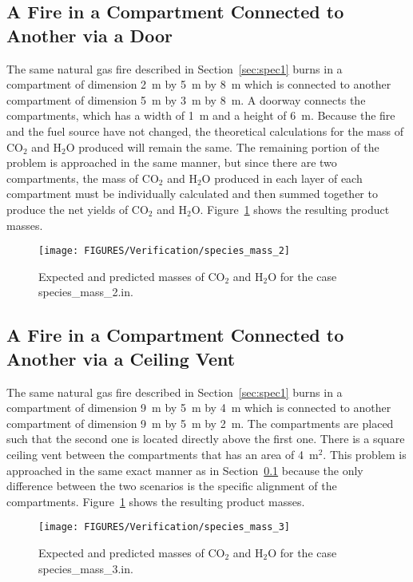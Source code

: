 \subsection{A Fire in a Compartment Connected to Another via a Door}
\label{sec:spec2}

The same natural gas fire described in Section~\ref{sec:spec1} burns in a compartment of dimension 2~m by 5~m by 8~m which is connected to another compartment of dimension 5~m by 3~m by 8~m. A doorway connects the compartments, which has a width of 1~m and a height of 6~m. Because the fire and the fuel source have not changed, the theoretical calculations for the mass of CO$_2$ and H$_2$O produced will remain the same. The remaining portion of the problem is approached in the same manner, but since there are two compartments, the mass of CO$_2$ and H$_2$O produced in each layer of each compartment must be individually calculated and then summed together to produce the net yields of CO$_2$ and H$_2$O. Figure~\ref{specmass2} shows the resulting product masses.
\begin{figure}[!ht]
\centering
\texttt{[image: FIGURES/Verification/species\_mass\_2]}
\caption[Results of the test case {\ct species\_mass\_1.in}]{Expected and predicted masses of CO$_2$ and H$_2$O for the case {\ct species\_mass\_2.in}.}
\label{specmass2}
\end{figure}

\subsection{A Fire in a Compartment Connected to Another via a Ceiling Vent}

The same natural gas fire described in Section~\ref{sec:spec1} burns in a compartment of dimension 9~m by 5~m by 4~m which is connected to another compartment of dimension 9~m by 5~m by 2~m. The compartments are placed such that the second one is located directly above the first one. There is a square ceiling vent between the compartments that has an area of 4~m$^2$. This problem is approached in the same exact manner as in Section~\ref{sec:spec2} because the only difference between the two scenarios is the specific alignment of the compartments.
Figure~\ref{specmass2} shows the resulting product masses.
\begin{figure}[!ht]
\centering
\texttt{[image: FIGURES/Verification/species\_mass\_3]}
\caption[Results of the test case {\ct species\_mass\_3.in}]{Expected and predicted masses of CO$_2$ and H$_2$O for the case {\ct species\_mass\_3.in}.}
\label{specmass3}
\end{figure}

